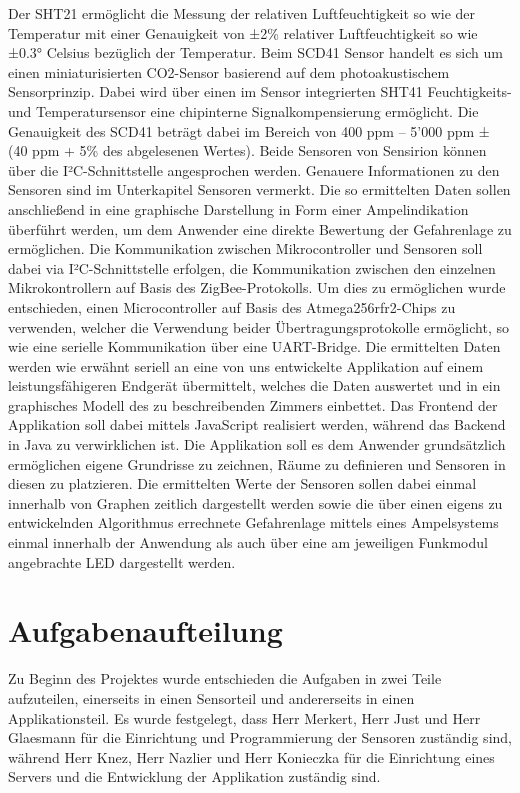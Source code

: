 \documentclass[]{article}
\begin{document}
	Der SHT21 ermöglicht die Messung der relativen Luftfeuchtigkeit so wie der Temperatur mit einer Genauigkeit von ±2\% relativer Luftfeuchtigkeit so wie ±0.3° Celsius bezüglich der Temperatur.\newline
	Beim SCD41 Sensor handelt es sich um einen miniaturisierten CO2-Sensor basierend auf dem photoakustischem Sensorprinzip. Dabei wird über einen im Sensor integrierten SHT41 Feuchtigkeits- und Temperatursensor eine chipinterne Signalkompensierung ermöglicht. Die Genauigkeit des SCD41 beträgt dabei im Bereich von 400 ppm – 5’000 ppm ± (40 ppm + 5\% des abgelesenen Wertes). Beide Sensoren von Sensirion können über die I²C-Schnittstelle angesprochen werden. Genauere Informationen zu den Sensoren sind im Unterkapitel Sensoren vermerkt.\newline
	Die so ermittelten Daten sollen anschließend in eine graphische Darstellung in Form einer Ampelindikation überführt werden, um dem Anwender eine direkte Bewertung der Gefahrenlage zu ermöglichen. Die Kommunikation zwischen Mikrocontroller und Sensoren soll dabei via I²C-Schnittstelle erfolgen, die Kommunikation zwischen den einzelnen Mikrokontrollern auf Basis des ZigBee-Protokolls. Um dies zu ermöglichen wurde entschieden, einen Microcontroller auf Basis des Atmega256rfr2-Chips zu verwenden, welcher die Verwendung beider Übertragungsprotokolle ermöglicht, so wie eine serielle Kommunikation über eine UART-Bridge. Die ermittelten Daten werden wie erwähnt seriell an eine von uns entwickelte Applikation auf einem leistungsfähigeren Endgerät übermittelt, welches die Daten auswertet und in ein graphisches Modell des zu beschreibenden Zimmers einbettet. Das Frontend der Applikation soll dabei mittels JavaScript realisiert werden, während das Backend in Java zu verwirklichen ist. Die Applikation soll es dem Anwender grundsätzlich ermöglichen eigene Grundrisse zu zeichnen, Räume zu definieren und Sensoren in diesen zu platzieren. Die ermittelten Werte der Sensoren sollen dabei einmal innerhalb von Graphen zeitlich dargestellt werden sowie die über einen eigens zu entwickelnden Algorithmus errechnete Gefahrenlage mittels eines Ampelsystems einmal innerhalb der Anwendung als auch über eine am jeweiligen Funkmodul angebrachte LED dargestellt werden. 
	
	\section{Aufgabenaufteilung} %
	Zu Beginn des Projektes wurde entschieden die Aufgaben in zwei Teile aufzuteilen, einerseits in einen Sensorteil und andererseits in einen Applikationsteil. Es wurde festgelegt, dass Herr Merkert, Herr Just und Herr Glaesmann für die Einrichtung und Programmierung der Sensoren zuständig sind, während Herr Knez, Herr Nazlier und Herr Konieczka für die Einrichtung eines Servers und die Entwicklung der Applikation zuständig sind. 
\end{document}
